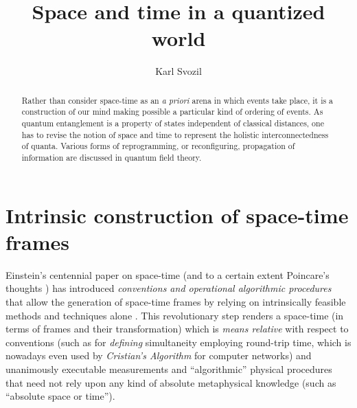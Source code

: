 \documentclass[%
  twocolumn,
 showpacs,
 showkeys,
 preprintnumbers,
 amsmath,amssymb,
 aps,
 prl,
  longbibliography,
 ]{revtex4-1}
\theoremstyle{definition}
\theoremstyle{remark}
\begin{document}
\title{Space and time in a quantized world}


\author{Karl Svozil}
 



\begin{abstract}
Rather than consider space-time as an {\em a priori} arena in which events take place, it is a construction of our mind making possible a particular kind of ordering of events. As quantum entanglement is a property of states independent of classical distances, one has to revise the notion of space and time to represent the holistic interconnectedness of quanta. Various forms of reprogramming, or reconfiguring, propagation of information are discussed in quantum field theory.
\end{abstract}

\maketitle


\section{Intrinsic construction of space-time frames}

Einstein's centennial paper on space-time \cite{ein-05,naber}
(and to a certain extent Poincare's thoughts \cite{poincare02}) has introduced
{\em conventions and operational algorithmic procedures} that allow
the generation of space-time frames by relying on intrinsically feasible methods and techniques alone \cite{toffoli:79,svozil-94}.
This revolutionary step renders a space-time (in terms of frames and their transformation) which
is {\em means relative} \cite{Myrvold2011237} with respect to conventions (such as for {\em defining} simultaneity employing round-trip time, which is
nowadays even used by {\em Cristian's Algorithm} for computer networks)
and unanimously executable measurements and ``algorithmic'' physical procedures
that need not rely upon any kind of absolute metaphysical knowledge (such as ``absolute space or time'').
\end{document}

